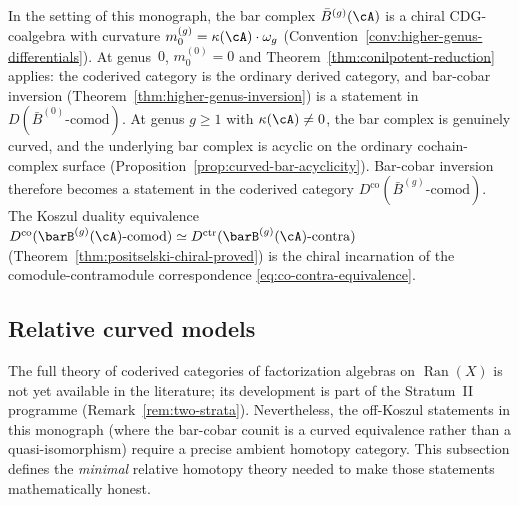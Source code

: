 \begin{remark}
\label{rem:coderived-bar-cobar}
In the setting of this monograph, the bar complex
$\bar{B}^{(g)}(\cA)$ is a chiral CDG-coalgebra with curvature
$m_0^{(g)} = \kappa(\cA) \cdot \omega_g$
(Convention~\ref{conv:higher-genus-differentials}).
At genus~$0$, $m_0^{(0)} = 0$ and
Theorem~\ref{thm:conilpotent-reduction} applies: the coderived
category is the ordinary derived category, and bar-cobar
inversion (Theorem~\ref{thm:higher-genus-inversion})
is a statement in $D(\bar{B}^{(0)}\text{-}\mathrm{comod})$.
At genus $g \geq 1$ with $\kappa(\cA) \neq 0$, the bar complex
is genuinely curved, and the underlying bar complex is acyclic on
the ordinary cochain-complex surface
\textup{(}Proposition~\ref{prop:curved-bar-acyclicity}\textup{)}.
Bar-cobar inversion therefore becomes a statement in the
coderived category
$D^{\mathrm{co}}(\bar{B}^{(g)}\text{-}\mathrm{comod})$.
The Koszul duality equivalence
$D^{\mathrm{co}}(\barB^{(g)}(\cA)\text{-}\mathrm{comod})
\simeq D^{\mathrm{ctr}}(\barB^{(g)}(\cA)\text{-}\mathrm{contra})$
\textup{(}Theorem~\ref{thm:positselski-chiral-proved}\textup{)} is the chiral
incarnation of the comodule-contramodule correspondence
\eqref{eq:co-contra-equivalence}.
\end{remark}


\subsection{Relative curved models}
\label{sec:coderived-models}

The full theory of coderived categories of factorization algebras
on $\operatorname{Ran}(X)$ is not yet available in the literature;
its development is part of the Stratum~II programme
(Remark~\ref{rem:two-strata}).  Nevertheless, the off-Koszul
statements in this monograph (where the bar-cobar counit is
a curved equivalence rather than a quasi-isomorphism) require
a precise ambient homotopy category.  This subsection defines the
\emph{minimal} relative homotopy theory needed to make those
statements mathematically honest.

